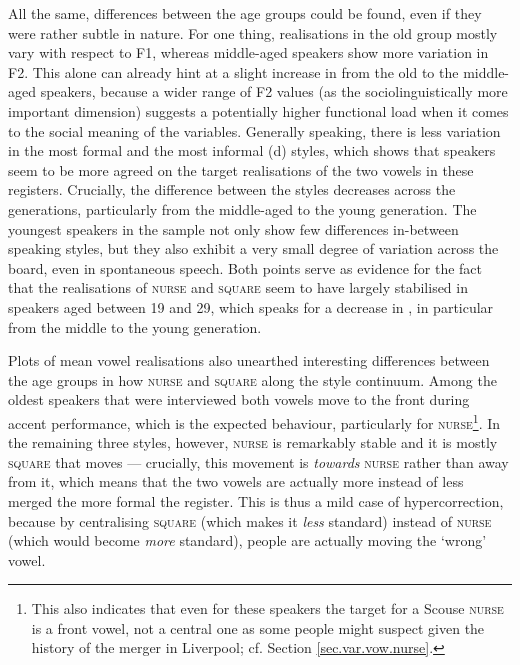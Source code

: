All the same, differences between the age groups could be found, even if they were rather subtle in nature.
For one thing, realisations in the old group mostly vary with respect to F1, whereas middle-aged speakers show more variation in F2.
This alone can already hint at a slight increase in  from the old to the middle-aged speakers, because a wider range of F2 values (as the sociolinguistically more important dimension) suggests a potentially higher functional load when it comes to the social meaning of the variables.
Generally speaking, there is less variation in the most formal and the most informal (d) styles, which shows that speakers seem to be more agreed on the target realisations of the two vowels in these registers.
Crucially, the difference between the styles decreases across the generations, particularly from the middle-aged to the young generation.
The youngest speakers in the sample not only show few differences in-between speaking styles, but they also exhibit a very small degree of variation across the board, even in spontaneous speech.
Both points serve as evidence for the fact that the realisations of \textsc{nurse} and \textsc{square} seem to have largely stabilised in speakers aged between 19 and 29, which speaks for a decrease in , in particular from the middle to the young generation.

Plots of mean vowel realisations also unearthed interesting differences between the age groups in how \textsc{nurse} and \textsc{square}  along the style continuum.
Among the oldest speakers that were interviewed both vowels move to the front during accent performance, which is the expected behaviour, particularly for \textsc{nurse}\footnote{This also indicates that even for these speakers the target for a Scouse \textsc{nurse} is a front vowel, not a central one as some people might suspect given the history of the merger in Liverpool; cf. Section \ref{sec.var.vow.nurse}.}.
In the remaining three styles, however, \textsc{nurse} is remarkably stable and it is mostly \textsc{square} that moves --- crucially, this movement is \emph{towards} \textsc{nurse} rather than away from it, which means that the two vowels are actually more instead of less merged the more formal the register.
This is thus a mild case of hypercorrection, because by centralising \textsc{square} (which makes it \emph{less} standard) instead of \textsc{nurse} (which would become \emph{more} standard), people are actually moving the `wrong' vowel.

